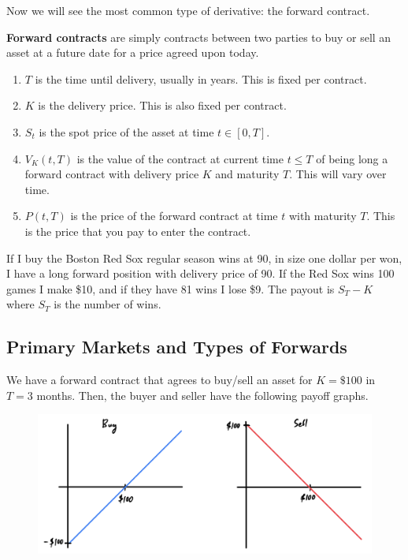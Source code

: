 \documentclass{article}
\begin{document}
    Now we will see the most common type of derivative: the forward contract. 

    \begin{definition}
      \textbf{Forward contracts} are simply contracts between two parties to buy or sell an asset at a future date for a price agreed upon today. 
      \begin{enumerate}
        \item $T$ is the time until delivery, usually in years. This is fixed per contract.
        \item $K$ is the delivery price. This is also fixed per contract. 
        \item $S_t$ is the spot price of the asset at time $t \in [0, T]$.
        \item $V_K (t, T)$ is the value of the contract at current time $t \leq T$ of being long a forward contract with delivery price $K$ and maturity $T$. This will vary over time. 
        \item $P(t, T)$ is the price of the forward contract at time $t$ with maturity $T$. This is the price that you pay to enter the contract.
      \end{enumerate}
    \end{definition}

    \begin{example}
      If I buy the Boston Red Sox regular season wins at 90, in size one dollar per won, I have a long forward position with delivery price of 90. If the Red Sox wins 100 games I make \$10, and if they have 81 wins I lose \$9. The payout is $S_T - K$ where $S_T$ is the number of wins. 
    \end{example}

  \subsection{Primary Markets and Types of Forwards}

    \begin{example}
      We have a forward contract that agrees to buy/sell an asset for $K = \$100$ in $T=3$ months. Then, the buyer and seller have the following payoff graphs. 
      \begin{figure}[H]
        \centering 
        \includegraphics[scale=0.4]{img/forward_example.png}
        \caption{} 
        \label{fig:foward_example}
      \end{figure}
    \end{example}
\end{document}
